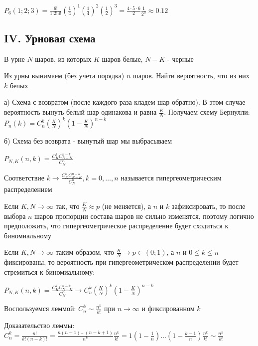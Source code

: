 \documentclass[12pt]{article}
\begin{document}
    $P_6(1; 2; 3) = \frac{6!}{1!2!3!} \left(\frac{1}{4}\right)^1 \left(\frac{1}{4}\right)^2 \left(\frac{1}{2}\right)^3 = \frac{4 \cdot 5 \cdot 6}{2} \frac{1}{2^9} \approx 0.12$

    \subsection{IV. Урновая схема}

    В урне $N$ шаров, из которых $K$ шаров белые, $N - K$ - черные

    Из урны вынимаем (без учета порядка) $n$ шаров. Найти вероятность, что из них $k$ белых

    а) Схема с возвратом (после каждого раза кладем шар обратно). В этом случае вероятность вынуть белый шар одинакова и
    равна $\frac{K}{N}$. Получаем схему Бернулли: $P_n(k) = C^k_n \left(\frac{K}{N}\right)^k \left(1 - \frac{K}{N}\right)^{n - k}$

    б) Схема без возврата - вынутый шар мы выбрасываем

    $P_{N, K} (n, k) = \frac{C^k_K C^{n - k}_{N - K}}{C^n_N}$

    \Def Соответствие $k \rightarrow \frac{C^k_K C^{n - k}_{N - K}}{C^n_N}, k = 0, \dots, n$ называется гипергеометрическим
    распределением

    \Nota Если $K, N \to \infty$ так, что $\frac{K}{N} \approx p$ (не меняется), а $n$ и $k$ зафиксировать, то после выбора
    $n$ шаров пропорции состава шаров не сильно изменятся, поэтому логично предположить, что гипергеометрическое распределение
    будет сходиться к биномиальному

    \begin{MyTheorem}
        \Ths Если $K, N \to \infty$ таким образом, что $\frac{K}{N} \to p \in (0;1)$, а $n$ и $0 \leq k \leq n$ фиксированы, то
        вероятность при гипергеометрическом распределении будет стремиться к биномиальному:

        $P_{N,K} (n, k) = \frac{C^k_K C^{n - k}_{N - K}}{C^n_N} \rightarrow C^k_n \left(\frac{K}{N}\right)^k \left(1 - \frac{K}{N}\right)^{n - k}$
    \end{MyTheorem}

    Воспользуемся леммой: $C^k_n \sim \frac{n^k}{k!}$ при $n \to \infty$ и фиксированном $k$

    Доказательство леммы: $C_n^k = \frac{n!}{k!(n - k)!} = \frac{n(n - 1) \dots (n - k + 1)}{n^k} \frac{n^k}{k!} = 1 \left(1 - \frac{1}{n}\right) \dots \left(1 - \frac{k - 1}{n}\right) \frac{n^k}{k!} \sim \frac{n^k}{k!}$
\end{document}

